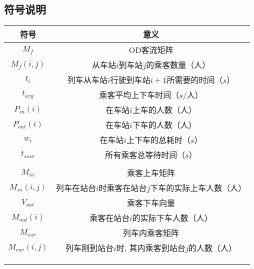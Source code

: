 \subsection{符号说明}

\begin{table}[h]
    \centering
    \begin{tabular}{@{}cc@{}}
    \toprule
    符号         & 意义                              \\ \midrule
    $M_f$       & OD客流矩阵                          \\
    $M_f(i,j)$  & 从车站$i$到车站$j$的乘客数量（人）            \\
    $t_i$       & 列车从车站$i$行驶到车站$i+1$所需要的时间（$s$） \\
    $t_{avg}$   & 乘客平均上下车时间（$s$/人）                  \\
    $P_{in}(i)$         &  在车站$i$上车的人数（人）    \\
    $P_{out}(i)$        & 在车站$i$下车的人数（人）   \\
    $w_i$       & 在车站$i$上下车的总耗时（$s$） \\
    $t_{sum}$   & 所有乘客总等待时间（$s$）     \\
                &                                 \\
    $M_{in}$    & 乘客上车矩阵           \\
    $M_{in}(i,j)$    & 列车在站台$i$时乘客在站台$j$下车的实际上车人数（人）     \\
    $V_{out}$    & 乘客下车向量           \\
    $M_{out}(i)$    & 乘客在站台$i$的实际下车人数（人）     \\
    $M_{cur}$    & 列车内乘客矩阵           \\
    $M_{cur}(i,j)$    & 列车刚到站台$i$时, 其内乘客到站台$j$的人数（人）     \\
                &                                 \\
                &                                 \\
                &                                 \\ \bottomrule
    \end{tabular}
\end{table}

